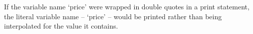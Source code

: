 If the variable name `price' were wrapped in double quotes in a print
statement, the literal variable name -- `price' -- would be printed
rather than being interpolated for the value it contains.
